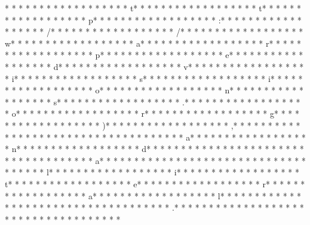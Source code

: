 * * *  * * *  * * *  *  * * *  *  * * *  * t* * *  * * *  * * *  *  * * *  *  * * *  * t* * *  * * *  * * *  *  * * *  *  * * *  * p* * *  * * *  * * *  *  * * *  *  * * *  * :* * *  * * *  * * *  *  * * *  *  * * *  * /* * *  * * *  * * *  *  * * *  *  * * *  * /* * *  * * *  * * *  *  * * *  *  * * *  * w* * *  * * *  * * *  *  * * *  *  * * *  * a* * *  * * *  * * *  *  * * *  *  * * *  * r* * *  * * *  * * *  *  * * *  *  * * *  * p* * *  * * *  * * *  *  * * *  *  * * *  * e* * *  * * *  * * *  *  * * *  *  * * *  * d* * *  * * *  * * *  *  * * *  *  * * *  * v* * *  * * *  * * *  *  * * *  *  * * *  * i* * *  * * *  * * *  *  * * *  *  * * *  * s* * *  * * *  * * *  *  * * *  *  * * *  * i* * *  * * *  * * *  *  * * *  *  * * *  * o* * *  * * *  * * *  *  * * *  *  * * *  * n* * *  * * *  * * *  *  * * *  *  * * *  * s* * *  * * *  * * *  *  * * *  *  * * *  * .* * *  * * *  * * *  *  * * *  *  * * *  * o* * *  * * *  * * *  *  * * *  *  * * *  * r* * *  * * *  * * *  *  * * *  *  * * *  * g* * *  * * *  * * *  *  * * *  *  * * *  * )* * *  * * *  * * *  *  * * *  *  * * *  * ,* * *  * * *  * * *  *  * * *  *  * * *  *  * * *  * * *  * * *  *  * * *  *  * * *  * a* * *  * * *  * * *  *  * * *  *  * * *  * n* * *  * * *  * * *  *  * * *  *  * * *  * d* * *  * * *  * * *  *  * * *  *  * * *  *  * * *  * * *  * * *  *  * * *  *  * * *  * a* * *  * * *  * * *  *  * * *  *  * * *  *  * * *  * * *  * * *  *  * * *  *  * * *  * l* * *  * * *  * * *  *  * * *  *  * * *  * i* * *  * * *  * * *  *  * * *  *  * * *  * t* * *  * * *  * * *  *  * * *  *  * * *  * e* * *  * * *  * * *  *  * * *  *  * * *  * r* * *  * * *  * * *  *  * * *  *  * * *  * a* * *  * * *  * * *  *  * * *  *  * * *  * l* * *  * * *  * * *  *  * * *  *  * * *  *  * * *  * * *  * * *  *  * * *  *  * * *  * .* * *  * * *  * * *  *  * * *  *  * * *  *  * * *  * * *  * * *  *  * * *  *  * * *  * 
